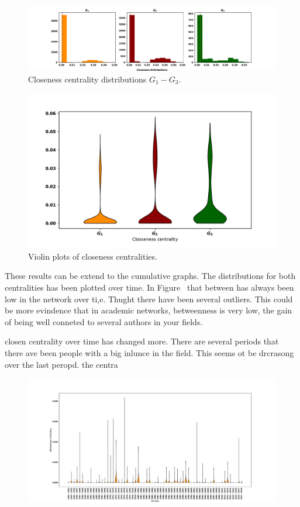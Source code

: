 \documentclass{article}
\theoremstyle{definition}
\begin{document}
\begin{figure}[!hbtp]
    \centering
    \includegraphics[width=\textwidth]{./assets/images/closeness_distributions.pdf}
    \caption{Closeness centrality distributions  \(G_1- G_3\).}\label{fig:closeness_dist}
\end{figure}

\begin{figure}[!hbtp]
    \centering
    \includegraphics[width=.7\textwidth]{./assets/images/closeness_violins.pdf}
    \caption{Violin plots of closeness centralities.}\label{fig:violin_closeness}
\end{figure}

These results can be extend to the cumulative graphs. The distributions for both
centralities has been plotted over time. In Figure~ that between has always
been low in the network over ti,e. Thught there have been several outliers.
This could be more evindence that in academic networks, betweenness is very low,
the gain of being well conneted to several authors in your fields.

closen centrality over time has changed more. There are several periods that
there ave been people with a big inlunce in the field. This seems ot be drcrasong
over the last peropd. 
the centra

\begin{figure}[!hbtp]
    \centering
    \includegraphics[width=\textwidth]{./assets/images/betweeness_over_time.pdf}
\end{figure}
\end{document}
